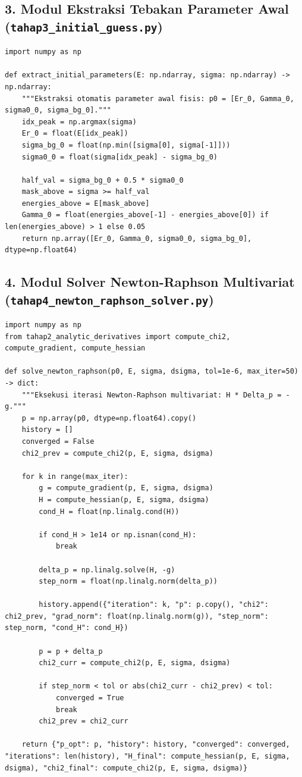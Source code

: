 \subsection*{3. Modul Ekstraksi Tebakan Parameter Awal (\texttt{tahap3\_initial\_guess.py})}
\begin{lstlisting}[caption={Heuristik fisis ekstraksi parameter awal p0 dari bentuk kurva data.}]
import numpy as np

def extract_initial_parameters(E: np.ndarray, sigma: np.ndarray) -> np.ndarray:
    """Ekstraksi otomatis parameter awal fisis: p0 = [Er_0, Gamma_0, sigma0_0, sigma_bg_0]."""
    idx_peak = np.argmax(sigma)
    Er_0 = float(E[idx_peak])
    sigma_bg_0 = float(np.min([sigma[0], sigma[-1]]))
    sigma0_0 = float(sigma[idx_peak] - sigma_bg_0)
    
    half_val = sigma_bg_0 + 0.5 * sigma0_0
    mask_above = sigma >= half_val
    energies_above = E[mask_above]
    Gamma_0 = float(energies_above[-1] - energies_above[0]) if len(energies_above) > 1 else 0.05
    return np.array([Er_0, Gamma_0, sigma0_0, sigma_bg_0], dtype=np.float64)
\end{lstlisting}

\subsection*{4. Modul Solver Newton-Raphson Multivariat (\texttt{tahap4\_newton\_raphson\_solver.py})}
\begin{lstlisting}[caption={Algoritma solver Newton-Raphson matriks dengan pemantauan bilangan kondisi.}]
import numpy as np
from tahap2_analytic_derivatives import compute_chi2, compute_gradient, compute_hessian

def solve_newton_raphson(p0, E, sigma, dsigma, tol=1e-6, max_iter=50) -> dict:
    """Eksekusi iterasi Newton-Raphson multivariat: H * Delta_p = -g."""
    p = np.array(p0, dtype=np.float64).copy()
    history = []
    converged = False
    chi2_prev = compute_chi2(p, E, sigma, dsigma)
    
    for k in range(max_iter):
        g = compute_gradient(p, E, sigma, dsigma)
        H = compute_hessian(p, E, sigma, dsigma)
        cond_H = float(np.linalg.cond(H))
        
        if cond_H > 1e14 or np.isnan(cond_H):
            break
            
        delta_p = np.linalg.solve(H, -g)
        step_norm = float(np.linalg.norm(delta_p))
        
        history.append({"iteration": k, "p": p.copy(), "chi2": chi2_prev, "grad_norm": float(np.linalg.norm(g)), "step_norm": step_norm, "cond_H": cond_H})
        
        p = p + delta_p
        chi2_curr = compute_chi2(p, E, sigma, dsigma)
        
        if step_norm < tol or abs(chi2_curr - chi2_prev) < tol:
            converged = True
            break
        chi2_prev = chi2_curr
        
    return {"p_opt": p, "history": history, "converged": converged, "iterations": len(history), "H_final": compute_hessian(p, E, sigma, dsigma), "chi2_final": compute_chi2(p, E, sigma, dsigma)}
\end{lstlisting}
